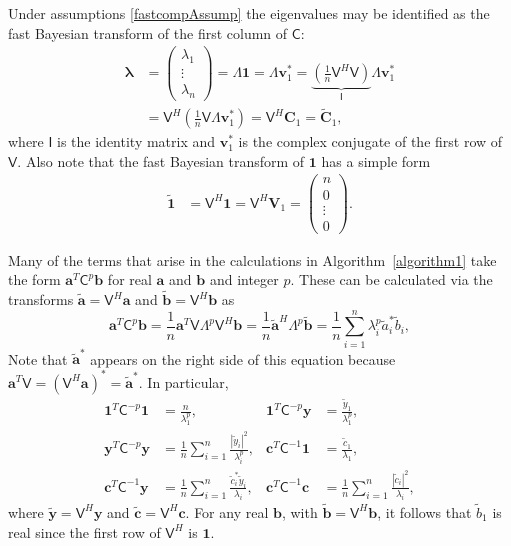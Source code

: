 \documentclass{iitthesis}          %
\newcommand{\bm}[1]{\boldsymbol{#1}}
\newcommand{\vlambda}{{\bm{\lambda}}}
\newcommand{\va}{\bm{a}}
\newcommand{\vb}{\bm{b}}
\newcommand{\vc}{\bm{c}}
\newcommand{\vC}{\bm{C}}
\newcommand{\vv}{\bm{v}}
\newcommand{\vV}{\bm{V}}
\newcommand{\vy}{\bm{y}}
\newcommand{\vone}{\bm{1}}
\newcommand{\mC}{\mathsf{C}}
\newcommand{\mCInv}{{\mathsf{C}^{-1}}}
\newcommand{\mLambda}{\mathsf{\Lambda}}
\newcommand{\mV}{\mathsf{V}}
\def\abs#1{\ensuremath{\left \lvert #1 \right \rvert}}
\begin{document}
Under assumptions \eqref{fastcompAssump} the eigenvalues may be identified as the fast Bayesian transform of the first column of $\mC$:
\begin{align}
\nonumber
\vlambda 
& = \begin{pmatrix}
\lambda_1 \\ \vdots \\ \lambda_n
\end{pmatrix} = \mLambda \vone = \mLambda \vv_1^* 
= \underbrace{\left( \frac 1n \mV^H  \mV \right) }_{\mathsf{I}} \mLambda \vv_1^* \\
&= \mV^H \left( \frac 1n \mV \mLambda \vv_1^* \right)
= \mV^H \vC_1 =  \widetilde{\vC}_1,
\label{eqn:fast_transform_to_eigvalues}
\end{align}
where $\mathsf{I}$ is the identity matrix and $\vv_1^*$ is the complex conjugate of the first row of $\mV$. 
Also note that the fast Bayesian transform of $\vone$ has a simple form
\begin{align*} 
\widetilde{\vone}
& = \mV^H \vone = \mV^H \vV_1 = \begin{pmatrix}n \\ 0 \\ \vdots \\ 0 \end{pmatrix}.
\label{eqn:fast_transform_one}
\end{align*}

Many of the terms that arise in the calculations in  Algorithm~\ref{algorithm1} take the form $\va^T\mC^{p}\vb$ for real $\va$ and $\vb$ and integer $p$.  These can be calculated via the transforms $\widetilde{\va} = \mV^H \va$ and $\widetilde{\vb} = \mV^H \vb$ as 
\begin{equation*}
\va^T\mC^p\vb = \frac 1n \va^T \mV \mLambda^p \mV^H \vb
= \frac 1n \widetilde{\va}^H\mLambda^p \widetilde{\vb}
= \frac 1n \sum_{i=1}^n \lambda_i^p \widetilde{a}_i^* \widetilde{b}_i, 
\end{equation*}
Note that $\widetilde{\va}^*$ appears on the right side of this equation because $\va^T \mV = (\mV^H \va)^* = \widetilde{\va}^*$. In particular,
\begin{align*}
\vone^T\mC^{-p}\vone & = \frac{n}{\lambda_1^p},
&
\vone^T\mC^{-p}\vy &= \frac{\widetilde{y}_1}{\lambda_1^p},
\\
\vy^T\mC^{-p} \vy &= \frac 1n \sum_{i=1}^n \frac{\abs{\widetilde{y}_i}^2}{\lambda_i^p},
&
\vc^T\mCInv \vone &= \frac{\widetilde{c}_1}{\lambda_1},\\
\vc^T\mCInv \vy &= \frac 1n \sum_{i=1}^n \frac{\widetilde{c}_i^* \widetilde{y}_i}{\lambda_i}, & 
\vc^T\mCInv \vc &= \frac 1n \sum_{i=1}^n \frac{\abs{\widetilde{c}_i}^2}{\lambda_i},
\end{align*}
where $\widetilde{\vy} = \mV^H \vy$ and 
$\widetilde{\vc} = \mV^H \vc$.  For any real $\vb$, with $\widetilde{\vb} = \mV^H\vb$, it follows that $\widetilde{b}_1$ is real since the first row of $\mV^H$ is $\vone$.
\end{document}
